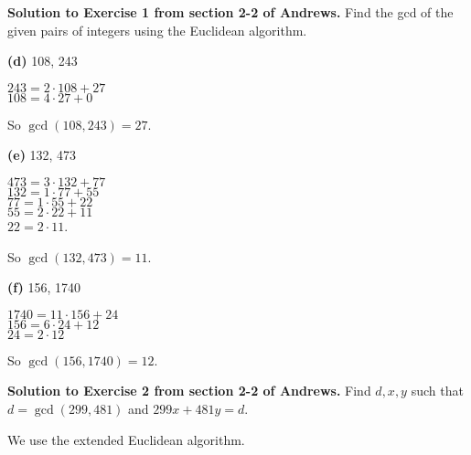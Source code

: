 \documentclass[oneside,12pt]{amsart}
\begin{document}
\bigskip

\textbf{Solution to Exercise 1 from section 2-2 of Andrews.} Find the gcd of the
given pairs of integers using the Euclidean algorithm.

\bigskip

\textbf{(d)}  108, 243

\bigskip

$243 = 2\cdot 108 + 27$ \\
$108 = 4\cdot27 + 0$

\bigskip

So $\gcd(108, 243) = 27$.

\bigskip

\textbf{(e)} 132, 473

\bigskip

$473 = 3\cdot 132 + 77$ \\
$132 = 1 \cdot 77 + 55$ \\
$ 77 = 1 \cdot 55 + 22$ \\
$ 55 = 2 \cdot 22 + 11$ \\
$ 22 = 2 \cdot 11$.

\bigskip

So $\gcd(132,473) = 11$.

\bigskip

\textbf{(f)} 156, 1740

\bigskip

$1740 = 11 \cdot 156 +24$ \\
$156 = 6\cdot 24 + 12$ \\
$ 24 = 2 \cdot 12$

\bigskip

So $\gcd(156,1740) = 12$.

\bigskip

\bigskip

\textbf{Solution to Exercise 2 from section 2-2 of Andrews.} Find
$d,x,y$ such that $d=\gcd(299,481)$ and $299x + 481y = d$.

\bigskip

We use the extended Euclidean algorithm.
\end{document}
